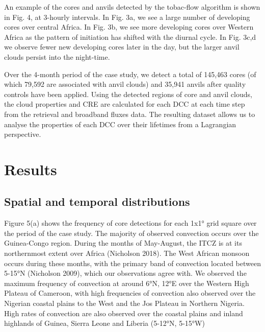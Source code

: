 An example of the cores and anvils detected by the tobac-flow algorithm
is shown in Fig. 4, at 3-hourly intervals. In Fig. 3a, we see a large
number of developing cores over central Africa. In Fig. 3b, we see more
developing cores over Western Africa as the pattern of initiation has
shifted with the diurnal cycle. In Fig. 3c,d we observe fewer new
developing cores later in the day, but the larger anvil clouds persist
into the night-time.

Over the 4-month period of the case study, we detect a total of 145,463
cores (of which 79,592 are associated with anvil clouds) and 35,941
anvils after quality controls have been applied. Using the detected
regions of core and anvil clouds, the cloud properties and CRE are
calculated for each DCC at each time step from the retrieval and
broadband fluxes data. The resulting dataset allows us to analyse the
properties of each DCC over their lifetimes from a Lagrangian
perspective.

\section{Results}

\subsection{Spatial and temporal distributions}

Figure 5(a) shows the frequency of core detections for each 1x1° grid
square over the period of the case study. The majority of observed
convection occurs over the Guinea-Congo region. During the months of
May-August, the ITCZ is at its northernmost extent over Africa
(Nicholson 2018). The West African monsoon occurs during these
months, with the primary band of convection located between 5-15°N
(Nicholson 2009), which our observations agree with. We observed the
maximum frequency of convection at around 6°N, 12°E over the Western
High Plateau of Cameroon, with high frequencies of convection also
observed over the Nigerian coastal plains to the West and the Jos
Plateau in Northern Nigeria. High rates of convection are also observed
over the coastal plains and inland highlands of Guinea, Sierra Leone and
Liberia (5-12°N, 5-15°W)

